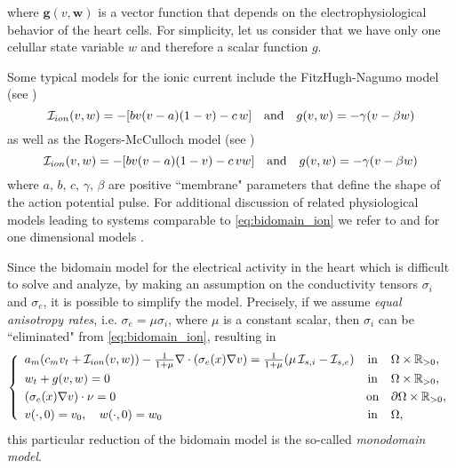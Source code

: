 \documentclass[10pt]{article}
\def\dis{\displaystyle}
\def\\Phivec{\mathbf{\Phi}}
\def\gvec{\mathbf{g}}
\def\wvec{\mathbf{w}}
\begin{document}
    where  $\gvec(v,\wvec)$ is a vector function that depends on the
    electrophysiological behavior of the heart cells.
    For simplicity, let us consider that we have only one celullar state variable $w$ and therefore a scalar function $g$.

    Some typical models for the ionic current include the FitzHugh-Nagumo model (see \cite{FN})
\begin{equation}\label{eq:FN}
    \mathcal{I}_{ion}(v,w)=-[bv(v-a)(1-v)- c\,w]\quad \hbox{and}\quad g(v,w)=-\gamma(v-\beta w)
\end{equation}
    as well as the Rogers-McCulloch model (see \cite{RM})
\begin{equation}\label{eq:RM}
    \mathcal{I}_{ion}(v,w)=-[bv(v-a)(1-v)- c\,vw] \quad \hbox{and}\quad g(v,w)=-\gamma(v-\beta w)
\end{equation}
    where $a,\,b,\,c,\,\gamma,\,\beta$ are positive ``membrane" parameters that define the shape of the action
    potential pulse.
 	 For additional discussion of related physiological models leading to systems comparable to \eqref{eq:bidomain_ion}
	we refer to \cite{keener} and for one dimensional models \cite{Peskoff1979,plonsey}.

    Since the bidomain model for the electrical activity in the heart which is difficult to solve and analyze,
    by making an assumption on the conductivity tensors $\sigma_i$ and $\sigma_e$, it is possible to simplify
    the model. Precisely, if we assume {\it equal anisotropy rates}, i.e. $\sigma_e = \mu \sigma_i$,
    where $\mu$ is a constant scalar, then $\sigma_i$ can be ``eliminated" from \eqref{eq:bidomain_ion},
    resulting in
\begin{equation}\label{eq:monodomain}
    \left\{
        \begin{array}{lcl}
        a_m(c_mv_t+\mathcal{I}_{ion}(v,w))
        -{1\over1+\mu}\nabla\cdot(\sigma_e(x)\nabla v)
        ={1\over 1+\mu}(\mu\,\mathcal{I}_{s,i}- \mathcal{I}_{s,e})
        &\mbox{in}&    \Omega \times \mathbb{R}_{>0},         \\
        \noalign{\smallskip}\dis
        w_t   +g(v,w)= 0
        &\mbox{in}&    \Omega \times \mathbb{R}_{>0},         \\
        \noalign{\smallskip}\dis
        (\sigma_e(x)\nabla v)\cdot \nu = 0
        &\mbox{on}&    \partial \Omega \times \mathbb{R}_{>0},    \\
        \noalign{\smallskip}\dis
        v(\cdot,0) =v_0,\quad w(\cdot,0) =w_0
        &\mbox{in}&    \Omega,
        \end{array}
    \right.
\end{equation}
    this particular reduction of the bidomain model is the so-called {\it monodomain model}.
\end{document}

